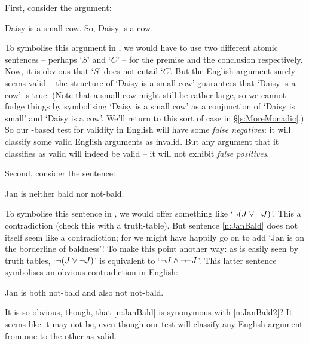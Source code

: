 First, consider the argument: 
	\begin{earg}
		\item[\ex{daisy}] Daisy is a small cow. So, Daisy is a cow.
	\end{earg}
To symbolise this argument in \TFL, we would have to use two different atomic sentences – perhaps `$S$'  and `$C$' – for the premise and the conclusion respectively. Now, it is obvious that `$S$' does not entail `$C$'. But the English argument surely seems valid – the structure of `Daisy is a small cow' guarantees that `Daisy is a cow' is true. (Note that a small cow might still be rather large, so we cannot fudge things by symbolising `Daisy is a small cow' as a conjunction of `Daisy is small' and `Daisy is a cow'. We'll return to this sort of case in §\ref{s:MoreMonadic}.) So our \TFL-based test for validity in English will have some \emph{false negatives}: it will classify some valid English arguments as invalid. But any argument that it classifies as valid will indeed be valid – it will not exhibit \emph{false positives}.

Second, consider the sentence:
	\begin{earg}
		\item[\ex{n:JanBald}] Jan is neither bald nor not-bald.
	\end{earg}
To symbolise this sentence in \TFL, we would offer something like `$\neg (J \vee \neg J)$'. This a contradiction (check this with a truth-table). But sentence \ref{n:JanBald} does not itself seem like a contradiction; for we might have happily go on to add `Jan is on the borderline of baldness'! To make this point another way: as is easily seen by truth tables, `$\neg (J \vee \neg J)$' is equivalent to `$\neg J \wedge \neg \neg J$'. This latter sentence symbolises an obvious contradiction in English:
	\begin{earg}
		\item[\ex{n:JanBald2}]  Jan is both not-bald and also not not-bald.
	\end{earg}
It is so obvious, though, that \ref{n:JanBald} is synonymous with \ref{n:JanBald2}? It seems like it may not be, even though our test will classify any English argument from one to the other as valid. 

